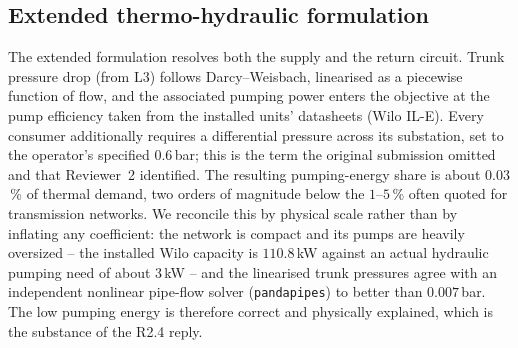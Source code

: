 \documentclass[a4paper,fleqn]{cas-dc}
\newcommand{\Lthree}{\ensuremath{\mathrm{L3}}}  %
\begin{document}
\subsection{Extended thermo-hydraulic formulation}
The extended formulation resolves both the supply and the return circuit. Trunk pressure drop
(from $\Lthree$) follows Darcy--Weisbach, linearised as a piecewise function of flow, and the
associated pumping power enters the objective at the pump efficiency taken from the installed
units' datasheets (Wilo IL-E). Every consumer additionally requires a differential pressure
across its substation, set to the operator's specified $0.6$\,bar; this is the term the
original submission omitted and that Reviewer~2 identified. The resulting pumping-energy share
is about $0.03$\,\% of thermal demand, two orders of magnitude below the $1$--$5$\,\% often
quoted for transmission networks. We reconcile this by physical scale rather than by inflating
any coefficient: the network is compact and its pumps are heavily oversized -- the installed
Wilo capacity is $110.8$\,kW against an actual hydraulic pumping need of about $3$\,kW -- and
the linearised trunk pressures agree with an independent nonlinear pipe-flow solver
(\texttt{pandapipes}) to better than $0.007$\,bar. The low pumping energy is therefore correct
and physically explained, which is the substance of the R2.4 reply.
\end{document}
